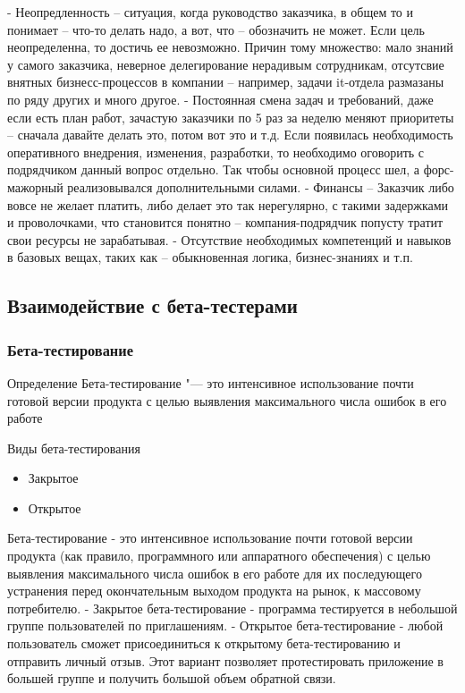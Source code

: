 \documentclass{../industrial-development}
\begin{document}
\lecturenotes
- Неопредленность – ситуация, когда руководство заказчика, в общем то и понимает – что-то делать надо, а вот, что – обозначить не может. Если цель неопределенна, то достичь ее невозможно. Причин тому множество: мало знаний у самого заказчика, неверное делегирование нерадивым сотрудникам, отсутсвие внятных бизнесс-процессов в компании – например, задачи it-отдела размазаны по ряду других и много другое.
- Постоянная смена задач и требований, даже если есть план работ, зачастую заказчики по 5 раз за неделю меняют приоритеты – сначала давайте делать это, потом вот это и т.д. Если появилась необходимость оперативного внедрения, изменения, разработки, то необходимо оговорить с подрядчиком данный вопрос отдельно. Так чтобы основной процесс шел, а форс-мажорный реализовывался дополнительными силами.
- Финансы – Заказчик либо вовсе не желает платить, либо делает это так нерегулярно, с такими задержками и проволочками, что становится понятно – компания-подрядчик попусту тратит свои ресурсы не зарабатывая.
- Отсутствие необходимых компетенций и навыков в базовых вещах, таких как – обыкновенная логика, бизнес-знаниях и т.п. 

\subsection{Взаимодействие с бета-тестерами}
\begin{frame} \frametitle{Бета-тестирование}
	\begin{block}{Определение}
		\alert{Бета-тестирование} "--- это интенсивное использование почти готовой версии продукта с целью выявления максимального числа ошибок в его работе
	\end{block}

	\begin{block}{Виды бета-тестирования}
		\begin{itemize}
			\item Закрытое
			\item Открытое
		\end{itemize}
	\end{block}
\end{frame}

\lecturenotes
Бета-тестирование - это интенсивное использование почти готовой версии продукта (как правило, программного или аппаратного обеспечения) с целью выявления максимального числа ошибок в его работе для их последующего устранения перед окончательным выходом продукта на рынок, к массовому потребителю.
- Закрытое бета-тестирование - программа тестируется в небольшой группе пользователей по приглашениям.
- Открытое бета-тестирование - любой пользователь сможет присоединиться к открытому бета-тестированию и отправить личный отзыв. Этот вариант позволяет протестировать приложение в большей группе и получить большой объем обратной связи.
\end{document}

